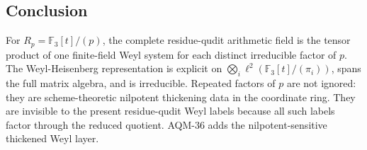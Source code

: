 \subsection{Conclusion}
For \(R_p=\mathbb F_3[t]/(p)\), the complete residue-qudit arithmetic field is
the tensor product of one finite-field Weyl system for each distinct
irreducible factor of \(p\).  The Weyl-Heisenberg
representation is explicit on
\(\bigotimes_i\ell^2(\mathbb F_3[t]/(\pi_i))\), spans the full matrix algebra,
and is irreducible.  Repeated factors of \(p\) are not ignored: they are
scheme-theoretic nilpotent thickening data in the coordinate ring.  They are
invisible to the present residue-qudit Weyl labels because all such labels
factor through the reduced quotient.  AQM-36 adds the nilpotent-sensitive
thickened Weyl layer.
